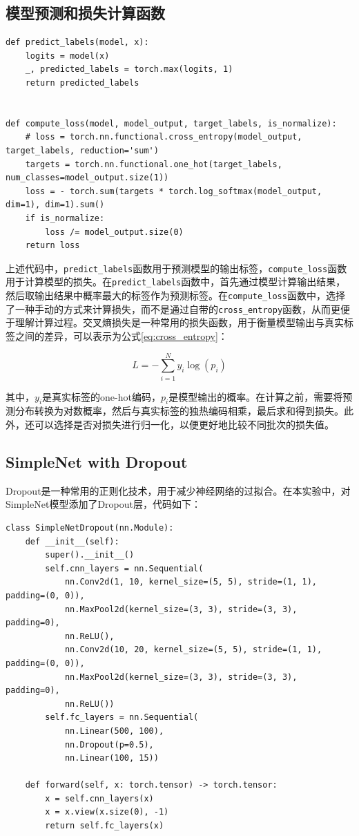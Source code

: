 \newpage
\subsection{模型预测和损失计算函数}

\begin{lstlisting}[style=Python]
def predict_labels(model, x):
    logits = model(x)
    _, predicted_labels = torch.max(logits, 1)
    return predicted_labels


def compute_loss(model, model_output, target_labels, is_normalize):
    # loss = torch.nn.functional.cross_entropy(model_output, target_labels, reduction='sum')
    targets = torch.nn.functional.one_hot(target_labels, num_classes=model_output.size(1))
    loss = - torch.sum(targets * torch.log_softmax(model_output, dim=1), dim=1).sum()
    if is_normalize:
        loss /= model_output.size(0)
    return loss
\end{lstlisting}

上述代码中，\texttt{predict\_labels}函数用于预测模型的输出标签，\newline\texttt{compute\_loss}函数用于计算模型的损失。在\texttt{predict\_labels}函数中，首先通过模型计算输出结果，然后取输出结果中概率最大的标签作为预测标签。在\texttt{compute\_loss}函数中，选择了一种手动的方式来计算损失，而不是通过自带的\texttt{cross\_entropy}函数，从而更便于理解计算过程。交叉熵损失是一种常用的损失函数，用于衡量模型输出与真实标签之间的差异，可以表示为公式\ref{eq:cross_entropy}：

\begin{equation}
    L = -\sum_{i=1}^{N} y_i \log(p_i)
    \label{eq:cross_entropy}
\end{equation}

其中，$y_i$是真实标签的one-hot编码，$p_i$是模型输出的概率。在计算之前，需要将预测分布转换为对数概率，然后与真实标签的独热编码相乘，最后求和得到损失。此外，还可以选择是否对损失进行归一化，以便更好地比较不同批次的损失值。

\subsection{SimpleNet with Dropout}

Dropout是一种常用的正则化技术，用于减少神经网络的过拟合。在本实验中，对SimpleNet模型添加了Dropout层，代码如下：

\begin{lstlisting}[style=Python]
class SimpleNetDropout(nn.Module):
    def __init__(self):
        super().__init__()
        self.cnn_layers = nn.Sequential(
            nn.Conv2d(1, 10, kernel_size=(5, 5), stride=(1, 1), padding=(0, 0)),
            nn.MaxPool2d(kernel_size=(3, 3), stride=(3, 3), padding=0),
            nn.ReLU(),
            nn.Conv2d(10, 20, kernel_size=(5, 5), stride=(1, 1), padding=(0, 0)),
            nn.MaxPool2d(kernel_size=(3, 3), stride=(3, 3), padding=0),
            nn.ReLU())
        self.fc_layers = nn.Sequential(
            nn.Linear(500, 100),
            nn.Dropout(p=0.5),
            nn.Linear(100, 15))

    def forward(self, x: torch.tensor) -> torch.tensor:
        x = self.cnn_layers(x)
        x = x.view(x.size(0), -1)
        return self.fc_layers(x)
\end{lstlisting}

